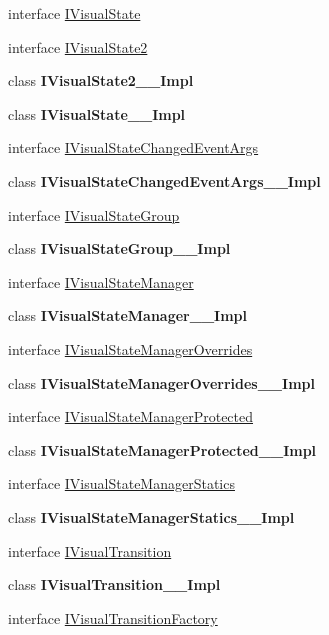 \begin{DoxyCompactItemize}
\item 
interface \hyperlink{interface_windows_1_1_u_i_1_1_xaml_1_1_i_visual_state}{I\+Visual\+State}
\item 
interface \hyperlink{interface_windows_1_1_u_i_1_1_xaml_1_1_i_visual_state2}{I\+Visual\+State2}
\item 
class {\bfseries I\+Visual\+State2\+\_\+\+\_\+\+Impl}
\item 
class {\bfseries I\+Visual\+State\+\_\+\+\_\+\+Impl}
\item 
interface \hyperlink{interface_windows_1_1_u_i_1_1_xaml_1_1_i_visual_state_changed_event_args}{I\+Visual\+State\+Changed\+Event\+Args}
\item 
class {\bfseries I\+Visual\+State\+Changed\+Event\+Args\+\_\+\+\_\+\+Impl}
\item 
interface \hyperlink{interface_windows_1_1_u_i_1_1_xaml_1_1_i_visual_state_group}{I\+Visual\+State\+Group}
\item 
class {\bfseries I\+Visual\+State\+Group\+\_\+\+\_\+\+Impl}
\item 
interface \hyperlink{interface_windows_1_1_u_i_1_1_xaml_1_1_i_visual_state_manager}{I\+Visual\+State\+Manager}
\item 
class {\bfseries I\+Visual\+State\+Manager\+\_\+\+\_\+\+Impl}
\item 
interface \hyperlink{interface_windows_1_1_u_i_1_1_xaml_1_1_i_visual_state_manager_overrides}{I\+Visual\+State\+Manager\+Overrides}
\item 
class {\bfseries I\+Visual\+State\+Manager\+Overrides\+\_\+\+\_\+\+Impl}
\item 
interface \hyperlink{interface_windows_1_1_u_i_1_1_xaml_1_1_i_visual_state_manager_protected}{I\+Visual\+State\+Manager\+Protected}
\item 
class {\bfseries I\+Visual\+State\+Manager\+Protected\+\_\+\+\_\+\+Impl}
\item 
interface \hyperlink{interface_windows_1_1_u_i_1_1_xaml_1_1_i_visual_state_manager_statics}{I\+Visual\+State\+Manager\+Statics}
\item 
class {\bfseries I\+Visual\+State\+Manager\+Statics\+\_\+\+\_\+\+Impl}
\item 
interface \hyperlink{interface_windows_1_1_u_i_1_1_xaml_1_1_i_visual_transition}{I\+Visual\+Transition}
\item 
class {\bfseries I\+Visual\+Transition\+\_\+\+\_\+\+Impl}
\item 
interface \hyperlink{interface_windows_1_1_u_i_1_1_xaml_1_1_i_visual_transition_factory}{I\+Visual\+Transition\+Factory}

\end{DoxyCompactItemize}
